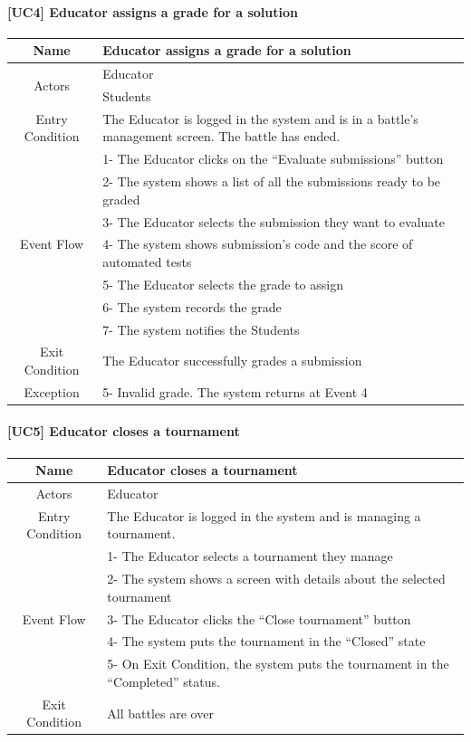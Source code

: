 \documentclass{article}
\begin{document}
\paragraph{[UC4] Educator assigns a grade for a solution}
\begin{center}
\begin{tabular}{|c|m{40em}|}
\hline
Name & Educator assigns a grade for a solution\\
\hline
\multirow{2}{4em}{Actors}
& Educator\\
& Students\\
\hline
Entry Condition &The Educator is logged in the system and is in a battle's management screen. The battle has ended.\\
\hline
\multirow{7}{4em}{Event Flow}
&1- The Educator clicks on the “Evaluate submissions” button\\
&2- The system shows a list of all the submissions ready to be graded\\
&3- The Educator selects the submission they want to evaluate\\
&4- The system shows submission's code and the score of automated tests\\
&5- The Educator selects the grade to assign\\
&6- The system records the grade\\
&7- The system notifies the Students\\
\hline
Exit Condition & The Educator successfully grades a submission\\
\hline
Exception & 5- Invalid grade. The system returns at Event 4\\
\hline
\end{tabular}
\end{center}

\paragraph{[UC5] Educator closes a tournament}
\begin{center}
\begin{tabular}{|c|m{40em}|}
\hline
Name & Educator closes a tournament\\
\hline
\multirow{1}{4em}{Actors}
& Educator\\
\hline
Entry Condition & The Educator is logged in the system and is managing a tournament.\\
\hline
\multirow{5}{4em}{Event Flow}
&1- The Educator selects a tournament they manage\\
&2- The system shows a screen with details about the selected tournament\\
&3- The Educator clicks the “Close tournament” button\\
&4- The system puts the tournament in the “Closed” state\\
&5- On Exit Condition, the system puts the tournament in the “Completed” status.\\
\hline
Exit Condition & All battles are over\\
\hline
\end{tabular}
\end{center}
\end{document}
